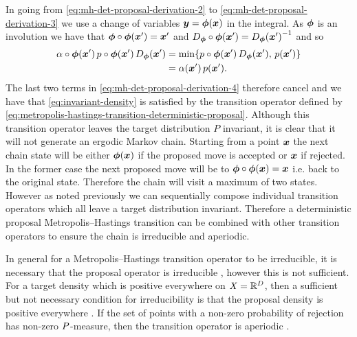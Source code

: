In going from \eqref{eq:mh-det-proposal-derivation-2} to \eqref{eq:mh-det-proposal-derivation-3} we use a change of variables $\boldsymbol{y} = \boldsymbol{\phi}(\boldsymbol{x})$ in the integral. As $\boldsymbol{\phi}$ is an involution we have that $\boldsymbol{\phi}\circ\boldsymbol{\phi}(\boldsymbol{x}') = \boldsymbol{x}'$ and $\jacobianproddet{\vct{\phi}}\circ\vct{\phi}(\vct{x}') = \jacobproddet{\vct{\phi}}{\vct{x}'}^{-1}$ and so
\begin{equation}\label{eq:mh-det-proposal-derivation-5}
\begin{split}
  \alpha\circ\vct{\phi}(\vct{x}') \, \tgtdens\circ\vct{\phi}(\vct{x}') \, 
  \jacobproddet{\vct{\phi}}{\vct{x}'} &=
  \min\lbr 
    \tgtdens\circ\vct{\phi}(\vct{x}') \, \jacobproddet{\vct{\phi}}{\vct{x}'},\,
    p(\vct{x}')
  \rbr 
  \\
  &=
  \alpha(\vct{x}')\,\tgtdens(\vct{x}').
\end{split}
\end{equation}
The last two terms in \eqref{eq:mh-det-proposal-derivation-4} therefore cancel and we have that \eqref{eq:invariant-density} is satisfied by the transition operator defined by \eqref{eq:metropolis-hastings-transition-deterministic-proposal}. Although this transition operator leaves the target distribution $P$ invariant, it is clear that it will not generate an ergodic Markov chain. Starting from a point $\boldsymbol{x}$ the next chain state will be either $\boldsymbol{\phi}(\boldsymbol{x})$ if the proposed move is accepted or $\boldsymbol{x}$ if rejected. In the former case the next proposed move will be to $\boldsymbol{\phi} \circ \boldsymbol{\phi}(\boldsymbol{x}) = \boldsymbol{x}$ i.e. back to the original state. Therefore the chain will visit a maximum of two states. However as noted previously we can sequentially compose individual transition operators which all leave a target distribution invariant. Therefore a deterministic proposal Metropolis--Hastings transition can be combined with other transition operators to ensure the chain is irreducible and aperiodic.

In general for a Metropolis--Hastings transition operator to be irreducible, it is necessary that the proposal operator is irreducible \citep{tierney1994markov}, however this is not sufficient. For a target density which is positive everywhere on $\mathit{X} = \mathbb{R}^D$, then a sufficient but not necessary condition for irreducibility is that the proposal density is positive everywhere \citep{roberts2004general}. If the set of points with a non-zero probability of rejection has non-zero $P$-measure, then the transition operator is aperiodic \citep{tierney1994markov}.


